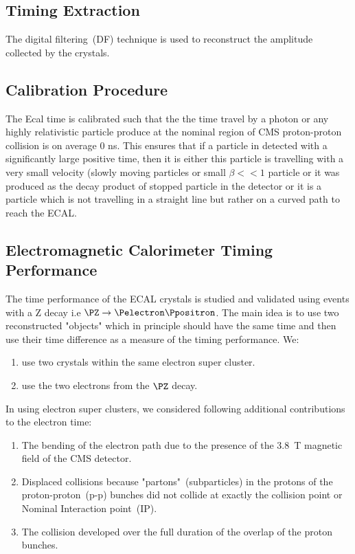 
\subsection{Timing Extraction}
The digital  filtering~(DF) technique is used to reconstruct the amplitude collected by the \pb crystals.

\subsection{Calibration Procedure}
The Ecal time is calibrated such that the the time travel by a photon or any highly relativistic  particle  produce at the nominal region of CMS proton-proton collision is on average 0 ns. This ensures that if a particle in detected with a significantly large positive time, then it is either this particle is travelling with a very small velocity (slowly moving particles or small $\beta << 1$ particle or it was produced as the decay product of stopped particle in the detector or it is a particle which is not travelling in a straight line but rather on a curved path to reach the ECAL.
\subsection{Electromagnetic Calorimeter Timing Performance}
The time performance of the ECAL crystals is studied and validated using events with a Z decay  i.e $\PZ \rightarrow \Pelectron \Ppositron$. 
\newline
The main idea is to use two reconstructed "objects" which in principle should have the same time and then use their time difference as a measure of the timing performance. We:
\begin{enumerate}
\item use two crystals within the same electron super cluster.
\item use the two electrons from the $\PZ$ decay. 
\end{enumerate}
In using electron super clusters, we considered following additional contributions to the electron time:
\begin{enumerate}
\item The bending of the electron path due to the presence of the 3.8~T magnetic field of the CMS detector.
\item  Displaced collisions  because "partons"~(subparticles) in the protons of the proton-proton~(p-p) bunches did not collide at exactly the collision point or Nominal Interaction point~(IP).
\item The collision developed over the full duration of the overlap of the proton bunches.
\end{enumerate}

